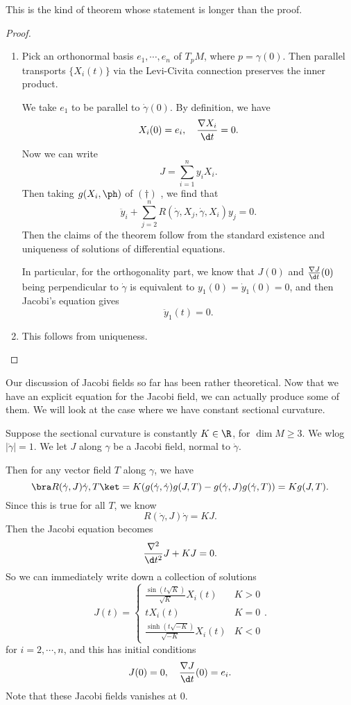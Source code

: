\documentclass[a4paper]{article}
\begin{document}
This is the kind of theorem whose statement is longer than the proof.
\begin{proof}\leavevmode
  \begin{enumerate}
    \item Pick an orthonormal basis $e_1,\cdots, e_n$ of $T_p M$, where $p = \gamma(0)$. Then parallel transports $\{X_i(t)\}$ via the Levi-Civita connection preserves the inner product.

      We take $e_1$ to be parallel to $\dot{\gamma}(0)$. By definition, we have
      \[
        X_i(0) = e_i,\quad \frac{\nabla X_i}{\d t} = 0.
      \]
      Now we can write
      \[
        J = \sum_{i = 1}^n y_i X_i.
      \]
      Then taking $g(X_i, \ph)$ of $(\dagger)$ , we find that
      \[
        \ddot{y}_i + \sum_{j = 2}^n R(\dot{\gamma}, X_j, \dot{\gamma}, X_i) y_j = 0.
      \]
      Then the claims of the theorem follow from the standard existence and uniqueness of solutions of differential equations.

      In particular, for the orthogonality part, we know that $J(0)$ and $\frac{\nabla J}{\d t}(0)$ being perpendicular to $\dot{\gamma}$ is equivalent to $y_1(0) = \dot{y}_1 (0) = 0$, and then Jacobi's equation gives
      \[
        \ddot{y}_1(t) = 0.
      \]
    \item This follows from uniqueness.\qedhere
  \end{enumerate}
\end{proof}

Our discussion of Jacobi fields so far has been rather theoretical. Now that we have an explicit equation for the Jacobi field, we can actually produce some of them. We will look at the case where we have constant sectional curvature.

\begin{eg}
  Suppose the sectional curvature is constantly $K \in \R$, for $\dim M \geq 3$. We wlog $|\dot{\gamma}| = 1$. We let $J$ along $\gamma$ be a Jacobi field, normal to $\dot{\gamma}$.

  Then for any vector field $T$ along $\gamma$, we have
  \[
    \bra R(\dot{\gamma}, J) \dot{\gamma}, T\ket = K(g(\dot{\gamma}, \dot{\gamma}) g(J, T) - g(\dot{\gamma}, J) g(\dot{\gamma}, T)) = K g(J, T).
  \]
  Since this is true for all $T$, we know
  \[
    R(\dot{\gamma}, J) \dot{\gamma} = KJ.
  \]
  Then the Jacobi equation becomes
  \[
    \frac{\nabla^2}{\d t^2}J + KJ = 0.
  \]
  So we can immediately write down a collection of solutions
  \[
    J(t) =
    \begin{cases}
      \frac{\sin(t \sqrt{K})}{\sqrt{K}} X_i(t) & K > 0\\
      t X_i(t) & K = 0\\
      \frac{\sinh(t \sqrt{-K})}{\sqrt{-K}} X_i(t) & K < 0
    \end{cases}.
  \]
  for $i = 2, \cdots, n$, and this has initial conditions
  \[
    J(0) = 0,\quad \frac{\nabla J}{\d t}(0) = e_i.
  \]
  Note that these Jacobi fields vanishes at $0$.
\end{eg}
\end{document}
